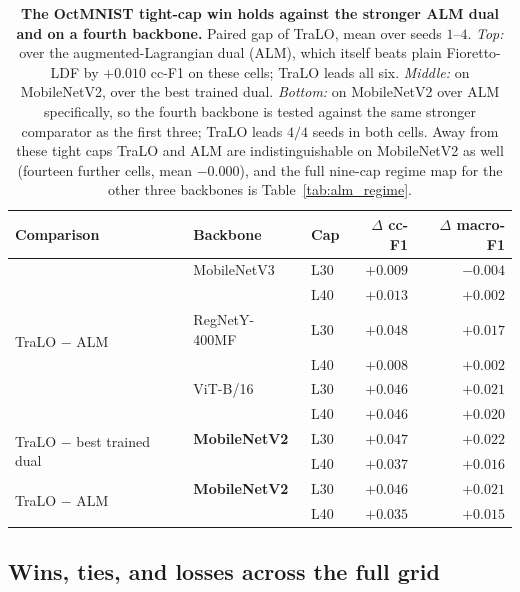 \documentclass[10pt]{article}
\begin{document}
\begin{table}[t]\centering\small\setlength{\tabcolsep}{5pt}
\caption{\textbf{The OctMNIST tight-cap win holds against the
stronger ALM dual and on a fourth backbone.} Paired gap of TraLO, mean over seeds
$1$--$4$. \emph{Top:} over the augmented-Lagrangian dual (ALM), which itself beats
plain Fioretto-LDF by $+0.010$ cc-F1 on these cells; TraLO leads all six.
\emph{Middle:} on MobileNetV2, over the best trained dual. \emph{Bottom:} on
MobileNetV2 over ALM specifically, so the fourth backbone is tested against the
same stronger comparator as the first three; TraLO leads $4/4$ seeds in both
cells. Away from these tight caps TraLO and ALM are indistinguishable on
MobileNetV2 as well (fourteen further cells, mean $-0.000$), and the full
nine-cap regime map for the other three backbones is
Table~\ref{tab:alm_regime}.}
\label{tab:almbb}
\begin{tabular}{lll rr}
\toprule
Comparison & Backbone & Cap & $\Delta$ cc-F1 & $\Delta$ macro-F1 \\
\midrule
\multirow{6}{*}{TraLO $-$ ALM}
 & MobileNetV3   & L30 & $+0.009$ & $-0.004$ \\
 &               & L40 & $+0.013$ & $+0.002$ \\
 & RegNetY-400MF & L30 & $+0.048$ & $+0.017$ \\
 &               & L40 & $+0.008$ & $+0.002$ \\
 & ViT-B/16      & L30 & $+0.046$ & $+0.021$ \\
 &               & L40 & $+0.046$ & $+0.020$ \\
\midrule
\multirow{2}{2.2cm}{TraLO $-$ best trained dual}
 & \textbf{MobileNetV2} & L30 & $+0.047$ & $+0.022$ \\
 &                      & L40 & $+0.037$ & $+0.016$ \\
\midrule
\multirow{2}{2.2cm}{{TraLO $-$ ALM}}
 & {\textbf{MobileNetV2}} & {L30} & {$+0.046$} & {$+0.021$} \\
 &                      & {L40} & {$+0.035$} & {$+0.015$} \\
\bottomrule
\end{tabular}
\end{table}

\subsection{Wins, ties, and losses across the full grid}
\label{sec:regime}
\end{document}
